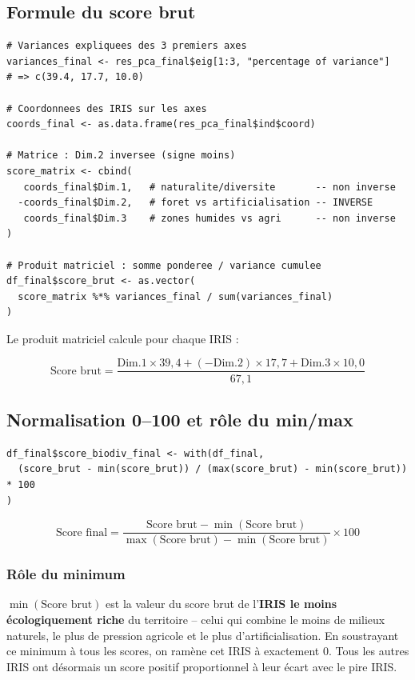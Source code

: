 \documentclass[12pt,a4paper]{report}
\begin{document}
\subsection{Formule du score brut}

\begin{lstlisting}
# Variances expliquees des 3 premiers axes
variances_final <- res_pca_final$eig[1:3, "percentage of variance"]
# => c(39.4, 17.7, 10.0)

# Coordonnees des IRIS sur les axes
coords_final <- as.data.frame(res_pca_final$ind$coord)

# Matrice : Dim.2 inversee (signe moins)
score_matrix <- cbind(
   coords_final$Dim.1,   # naturalite/diversite       -- non inverse
  -coords_final$Dim.2,   # foret vs artificialisation -- INVERSE
   coords_final$Dim.3    # zones humides vs agri      -- non inverse
)

# Produit matriciel : somme ponderee / variance cumulee
df_final$score_brut <- as.vector(
  score_matrix %*% variances_final / sum(variances_final)
)
\end{lstlisting}

Le produit matriciel calcule pour chaque IRIS :

\begin{equation}
  \text{Score brut} = \frac{\text{Dim.1} \times 39{,}4 + (-\text{Dim.2}) \times 17{,}7 + \text{Dim.3} \times 10{,}0}{67{,}1}
\end{equation}

\subsection{Normalisation 0--100 et rôle du min/max}

\begin{lstlisting}
df_final$score_biodiv_final <- with(df_final,
  (score_brut - min(score_brut)) / (max(score_brut) - min(score_brut)) * 100
)
\end{lstlisting}

\begin{equation}
  \text{Score final} = \frac{\text{Score brut} - \min(\text{Score brut})}{\max(\text{Score brut}) - \min(\text{Score brut})} \times 100
\end{equation}

\subsubsection*{Rôle du minimum}

$\min(\text{Score brut})$ est la valeur du score brut de l'\textbf{IRIS le moins écologiquement riche} du territoire -- celui qui combine le moins de milieux naturels, le plus de pression agricole et le plus d'artificialisation. En soustrayant ce minimum à tous les scores, on ramène cet IRIS à exactement 0. Tous les autres IRIS ont désormais un score positif proportionnel à leur écart avec le pire IRIS.
\end{document}
